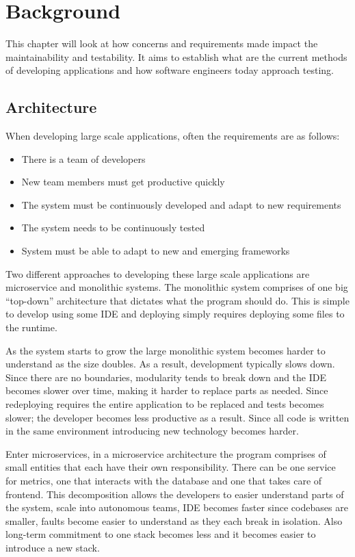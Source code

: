 \chapter{Background}\label{background}

This chapter will look at how concerns and requirements made impact the
maintainability and testability. It aims to establish what are the current
methods of developing applications and how software engineers today approach
testing. 

\section{Architecture} 

When developing large scale applications, often the requirements are as follows:

\begin{itemize}
    \item There is a team of developers
    \item New team members must get productive quickly
    \item The system must be continuously developed and adapt to new
        requirements
    \item The system needs to be continuously tested
    \item System must be able to adapt to new and emerging frameworks
\end{itemize}

Two different approaches to developing these large scale applications are
microservice and monolithic systems. The monolithic system comprises of one big
``top-down'' architecture that dictates what the program should do. This is
simple to develop using some IDE and deploying simply requires deploying some
files to the runtime. 

As the system starts to grow the large monolithic system becomes harder to
understand as the size doubles. As a result, development typically slows down.
Since there are no boundaries, modularity tends to break down and the IDE
becomes slower over time, making it harder to replace parts as needed. Since
redeploying requires the entire application to be replaced and tests becomes
slower; the developer becomes less productive as a result. Since all code is
written in the same environment introducing new technology becomes harder.

Enter microservices, in a microservice architecture the program comprises of
small entities that each have their own responsibility. There can be one service
for metrics, one that interacts with the database and one that takes care of
frontend. This decomposition allows the developers to easier understand parts of
the system, scale into autonomous teams, IDE becomes faster since codebases are
smaller, faults become easier to understand as they each break in isolation.
Also long-term commitment to one stack becomes less and it becomes easier to
introduce a new stack. 

